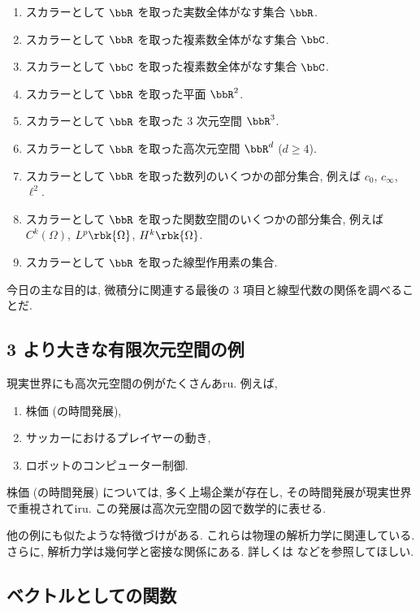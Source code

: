 \documentclass[openany, a4paper, oneside]{jsbook}
\begin{document}
\begin{enumerate}
\item スカラーとして $\bbR$ を取った実数全体がなす集合 $\bbR$.
\item スカラーとして $\bbR$ を取った複素数全体がなす集合 $\bbC$.
\item スカラーとして $\bbC$ を取った複素数全体がなす集合 $\bbC$.
\item スカラーとして $\bbR$ を取った平面 $\bbR^2$.
\item スカラーとして $\bbR$ を取った 3 次元空間 $\bbR^3$.
\item スカラーとして $\bbR$ を取った高次元空間 $\bbR^d$ ($d \geq 4$).
\item スカラーとして $\bbR$ を取った数列のいくつかの部分集合, 例えば $c_0$, $c_{\infty}$, $\ell^2$.
\item スカラーとして $\bbR$ を取った関数空間のいくつかの部分集合, 例えば $C^k(\Omega)$, $L^p \rbk{\Omega}$, $H^k \rbk{\Omega}$.
\item スカラーとして $\bbR$ を取った線型作用素の集合.
\end{enumerate}

今日の主な目的は, 微積分に関連する最後の 3 項目と線型代数の関係を調べることだ.
\subsection{3 より大きな有限次元空間の例\label{linear-algebra-and-calculus-8}}

現実世界にも高次元空間の例がたくさんあru.
例えば,
\begin{enumerate}
\item 株価 (の時間発展),
\item サッカーにおけるプレイヤーの動き,
\item ロボットのコンピューター制御.
\end{enumerate}
株価 (の時間発展) については,
多く上場企業が存在し, その時間発展が現実世界で重視されてiru.
この発展は高次元空間の図で数学的に表せる.

他の例にも似たような特徴づけがある.
これらは物理の解析力学に関連している.
さらに, 解析力学は幾何学と密接な関係にある.
詳しくは \cite{KenjiFukaya1, NakamuraYamamoto1, NakamuraYamamoto2} などを参照してほしい.
\subsection{ベクトルとしての関数}
\end{document}

